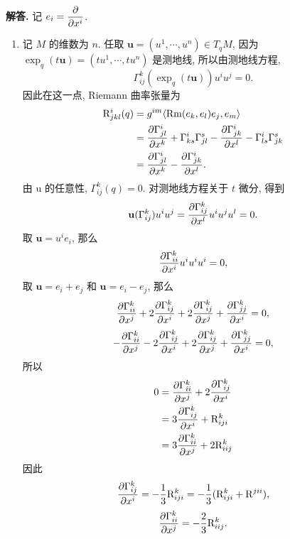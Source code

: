 \documentclass{ctexart}
\newenvironment{solution}{\par\noindent\textbf{解答. }}{\par}
\begin{document}
\begin{solution}
    记 $e_i = \dfrac{\partial }{\partial x^{i}}$.
    \begin{enumerate}[label = (\roman*)]
        \item\label{enum::1} 记 $M$ 的维数为 $n$. 任取 $\mathbf{u} = (u^1, \cdots, u^n) \in T_q M$, 因为 $\exp_q(t\mathbf{u}) = (tu^1, \cdots, tu^n)$ 是测地线, 所以由测地线方程,
        \[
            \Gamma^{k}_{ij}(\exp_q(t\mathbf{u})) u^i u^j = 0.
        \]
        因此在这一点, Riemann 曲率张量为
        \[
            \begin{aligned}
            \mathrm{R}^{i}_{jkl}(q) ={}& g^{im}\langle {\mathrm{Rm}(e_k, e_l)e_j}, {e_m} \rangle \\
            ={}& \dfrac{\partial \Gamma^{i}_{jl}}{\partial x^k} + \Gamma^{i}_{ks}\Gamma^{s}_{jl} - \dfrac{\partial \Gamma^{i}_{jk}}{\partial x^l} - \Gamma^{i}_{ls}\Gamma^{s}_{jk} \\
            ={}& \dfrac{\partial \Gamma^{i}_{jl}}{\partial x^k}- \dfrac{\partial \Gamma^{i}_{jk}}{\partial x^l}.
            \end{aligned}
        \]
        由 $\mathrm{u}$ 的任意性, $\Gamma^{k}_{ij}(q) = 0$. 对测地线方程关于 $t$ 微分, 得到
        \[
            \mathbf{u}(\Gamma^{k}_{ij}) u^i u^j = \dfrac{\partial \Gamma^k_{ij}}{\partial x^l}u^i u^j u^l = 0.
        \]
        取 $\mathbf{u} = u^i e_i$, 那么
        \[
            \dfrac{\partial \Gamma^k_{ii}}{\partial x^i}u^i u^i u^i = 0,
        \]
        取 $\mathbf{u} = e_i + e_j$ 和 $\mathbf{u} = e_i - e_j$, 那么
        \[
            \dfrac{\partial \Gamma^{k}_{ii}}{\partial x^j} + 2\dfrac{\partial \Gamma^{k}_{ij}}{\partial x^i} + 2\dfrac{\partial \Gamma^{k}_{ij}}{\partial x^j} + \dfrac{\partial \Gamma^{k}_{jj}}{\partial x^i} = 0,
        \]
        \[
            -\dfrac{\partial \Gamma^{k}_{ii}}{\partial x^j} - 2\dfrac{\partial \Gamma^{k}_{ij}}{\partial x^i} + 2\dfrac{\partial \Gamma^{k}_{ij}}{\partial x^j} + \dfrac{\partial \Gamma^{k}_{jj}}{\partial x^i} = 0,
        \]
        所以 
        \[
            \begin{aligned}
                0 ={} & \dfrac{\partial \Gamma^{k}_{ii}}{\partial x^j} + 2\dfrac{\partial \Gamma^{k}_{ij}}{\partial x^i} \\
                ={} & 3\dfrac{\partial \Gamma^{k}_{ij}}{\partial x^i} + \mathrm{R}^k_{iji} \\
                ={} & 3\dfrac{\partial \Gamma^{k}_{ii}}{\partial x^j} + 2\mathrm{R}^k_{iij}
            \end{aligned}
        \]
        因此 
        \[
            \dfrac{\partial \Gamma^{k}_{ij}}{\partial x^i} = -\dfrac{1}{3}\mathrm{R}^k_{iji} = -\dfrac{1}{3}(\mathrm{R}^k_{iji} + \mathrm{R}^{jii}),
        \]
        \[
            \dfrac{\partial \Gamma^{k}_{ii}}{\partial x^j} = -\dfrac{2}{3}\mathrm{R}^k_{iij}.
        \]


\end{enumerate}
\end{solution}
\end{document}
